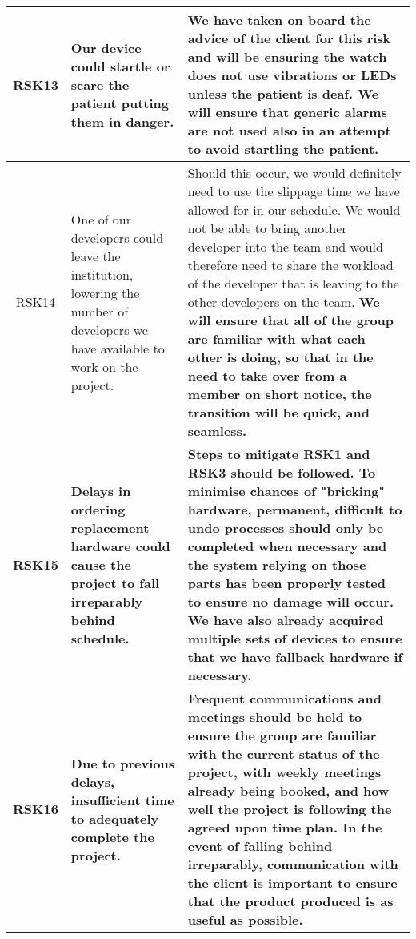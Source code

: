 \begin{xltabular}[H]{\textwidth}{c | X | X}
    \midrule

    RSK13

    &

    Our device could startle or scare the patient putting them in danger.

    &

    We have taken on board the advice of the client for this risk and will be ensuring the watch does not use vibrations or LEDs unless the patient is deaf. We will ensure that generic alarms are not used also in an attempt to avoid startling the patient.\\

    \midrule

    RSK14

    &

    One of our developers could leave the institution, lowering the number of developers we have available to work on the project.

    &

    Should this occur, we would definitely need to use the slippage time we have allowed for in our schedule. We would not be able to bring another developer into the team and would therefore need to share the workload of the developer that is leaving to the other developers on the team. \textbf{We will ensure that all of the group are familiar with what each other is doing, so that in the need to take over from a member on short notice, the transition will be quick, and seamless.}\\
    
    \midrule

    \textbf{RSK15}

    &

    \textbf{Delays in ordering replacement hardware could cause the project to fall irreparably behind schedule.}

    &

   \textbf{Steps to mitigate RSK1 and RSK3 should be followed. To minimise chances of "bricking" hardware, permanent, difficult to undo processes should only be completed when necessary and the system relying on those parts has been properly tested to ensure no damage will occur. We have also already acquired multiple sets of devices to ensure that we have fallback hardware if necessary.} \\
   
    \midrule

    \textbf{RSK16}

    &

    \textbf{Due to previous delays, insufficient time to adequately complete the project.}

    &

   \textbf{Frequent communications and meetings should be held to ensure the group are familiar with the current status of the project, with weekly meetings already being booked, and how well the project is following the agreed upon time plan. In the event of falling behind irreparably, communication with the client is important to ensure that the product produced is as useful as possible.}\\

\end{xltabular}
\label{tbl:risk_table}
